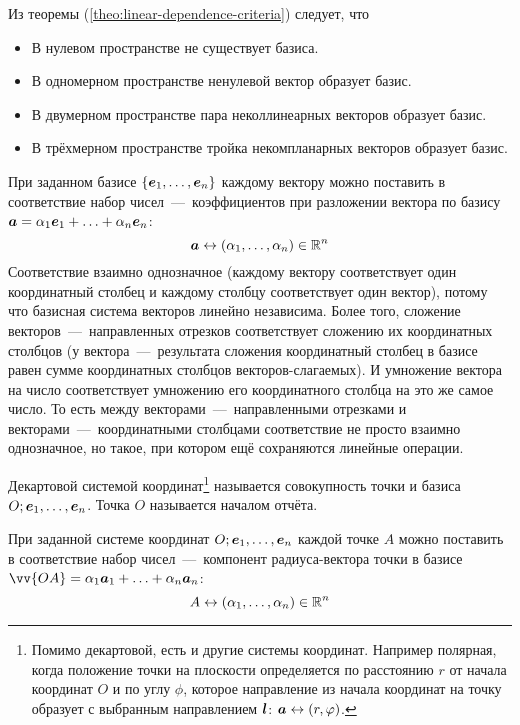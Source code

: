 \documentclass[a4paper,12pt]{article}
\begin{document}
  Из теоремы (\ref{theo:linear-dependence-criteria}) следует, что
  \begin{itemize}
    \item В нулевом пространстве не существует базиса.
    \item В одномерном пространстве ненулевой вектор образует базис.
    \item В двумерном пространстве пара неколлинеарных векторов образует базис.
    \item В трёхмерном пространстве тройка некомпланарных векторов образует базис.
  \end{itemize}
  
  \begin{remark}
    При заданном базисе $\{\boldsymbol e_1, \ldots, \boldsymbol e_n\}$ каждому вектору можно поставить в соответствие набор чисел~---~коэффициентов при разложении вектора по базису $\bds a \hm= \alpha_1 \bds e_1 \hm+ \ldots \hm+ \alpha_n \bds e_n$:
    \[
        \boldsymbol a \leftrightarrow (\alpha_1, \ldots, \alpha_n) \in \operatorname{\mathbb R}^n
    \]
    Соответствие взаимно однозначное (каждому вектору соответствует один координатный столбец и каждому столбцу соответствует один вектор), потому что базисная система векторов линейно независима.
    Более того, сложение векторов~---~направленных отрезков соответствует сложению их координатных столбцов (у вектора~---~результата сложения координатный столбец в базисе равен сумме координатных столбцов векторов-слагаемых).
    И умножение вектора на число соответствует умножению его координатного столбца на это же самое число.
    То есть между векторами~---~направленными отрезками и векторами~---~координатными столбцами соответствие не просто взаимно однозначное, но такое, при котором ещё сохраняются линейные операции.
  \end{remark}
  
  \begin{definition}
    Декартовой системой координат\footnote{Помимо декартовой, есть и другие системы координат. Например полярная, когда положение точки на плоскости определяется по расстоянию $r$ от начала координат $O$ и по углу $\phi$, которое направление из начала координат на точку образует с выбранным направлением $\boldsymbol l$: $\bds a \hm\leftrightarrow (r, \phi)$.} называется совокупность точки и базиса $O; \boldsymbol e_1, \ldots, \boldsymbol e_n$.
    Точка $O$ называется началом отчёта.
  \end{definition}
  
  \begin{remark}
    При заданной системе координат $O; \boldsymbol e_1, \ldots, \boldsymbol e_n$ каждой точке $A$ можно поставить в соответствие набор чисел~---~компонент радиуса-вектора точки в базисе $\vv{OA} \hm= \alpha_1 \bds a_1 \hm+ \ldots \hm+ \alpha_n \bds a_n$:
    \[
      A \leftrightarrow (\alpha_1, \ldots, \alpha_n) \in \operatorname{\mathbb R}^n
    \]
  \end{remark}
  
\end{document}
